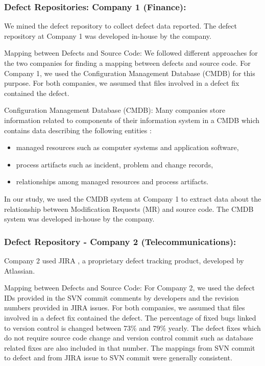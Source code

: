 \documentclass[times]{smrauth}
\begin{document}
\subsubsection{Defect Repositories: Company 1 (Finance):}

We mined the defect repository to collect defect data reported. The defect repository at Company 1 was developed in-house by the company.

Mapping between Defects and Source Code: We followed different approaches for the two companies for finding a mapping between defects and source code. For Company 1, we used the Configuration Management Database (CMDB) for this purpose. For both companies, we assumed that files involved in a  defect  fix contained the defect. 

Configuration Management Database (CMDB): Many companies store information related to components of their information system in a CMDB which contains data describing the following entities \cite{CMDBfederated}:

\begin{itemize}
\renewcommand{\labelitemi}{$\bullet$}
\item managed resources such as computer systems and application software,
\item process artifacts such as incident, problem and change records,
\item relationships among managed resources and process artifacts.
\end{itemize}

In our study, we used the CMDB system at Company 1 to extract data about the relationship between Modification Requests (MR) and source code. The CMDB system was developed in-house by the company.

\subsubsection{Defect Repository - Company 2 (Telecommunications):}

Company 2 used JIRA \cite{JIRA:2015:Online}, a proprietary  defect tracking product, developed by Atlassian.

Mapping between Defects and Source Code: For Company 2, we used the defect IDs provided in the SVN commit comments by developers and the revision numbers provided in JIRA issues. For both companies, we assumed that files involved in a  defect  fix contained the defect. The percentage of fixed bugs linked to version control is changed between 73\% and 79\% yearly. The  defect fixes which do not require source code change and version control commit such as database related fixes are also included in that number. The mappings from SVN commit to defect and from JIRA issue to SVN commit were generally consistent.  
 
\end{document}
